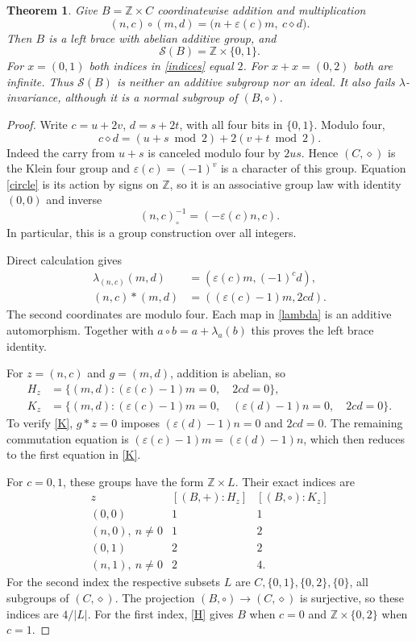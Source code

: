 \documentclass[11pt]{article}
\newtheorem{theorem}{Theorem}
\newcommand{\Z}{\mathbb Z}
\newcommand{\Sset}{\mathcal S}
\begin{document}
\begin{theorem}\label{main}
Give $B=\Z\times C$ coordinatewise addition and multiplication
\begin{equation}\label{circle}
 (n,c)\circ(m,d)=
 \bigl(n+\varepsilon(c)m,\ c\diamond d\bigr).
\end{equation}
Then $B$ is a left brace with abelian additive group, and
\[
 \Sset(B)=\Z\times\{0,1\}.
\]
For $x=(0,1)$ both indices in \eqref{indices} equal $2$.
For $x+x=(0,2)$ both are infinite.
Thus $\Sset(B)$ is neither an additive subgroup nor an ideal.
It also fails $\lambda$-invariance, although it is a normal subgroup of
$(B,\circ)$.
\end{theorem}

\begin{proof}
Write $c=u+2v$, $d=s+2t$, with all four bits in $\{0,1\}$.
Modulo four,
\[
 c\diamond d=(u+s\bmod2)+2(v+t\bmod2).
\]
Indeed the carry from $u+s$ is canceled modulo four by $2us$.
Hence $(C,\diamond)$ is the Klein four group and
$\varepsilon(c)=(-1)^v$ is a character of this group.
Equation \eqref{circle} is its action by signs on $\Z$, so it is an
associative group law with identity $(0,0)$ and inverse
\[
 (n,c)^{-1}_{\circ}=(-\varepsilon(c)n,c).
\]
In particular, this is a group construction over all integers.

Direct calculation gives
\begin{align}
 \lambda_{(n,c)}(m,d)&=(\varepsilon(c)m,(-1)^c d),\label{lambda}\\
 (n,c)*(m,d)&=((\varepsilon(c)-1)m,2cd).\label{star}
\end{align}
The second coordinates are modulo four.
Each map in \eqref{lambda} is an additive automorphism. Together
with $a\circ b=a+\lambda_a(b)$ this proves the left brace identity.

For $z=(n,c)$ and $g=(m,d)$, addition is abelian, so
\begin{align}
 H_z&=\{(m,d):(\varepsilon(c)-1)m=0,\quad 2cd=0\},\label{H}\\
 K_z&=\{(m,d):(\varepsilon(c)-1)m=0,\quad
             (\varepsilon(d)-1)n=0,\quad 2cd=0\}.\label{K}
\end{align}
To verify \eqref{K}, $g*z=0$ imposes
$(\varepsilon(d)-1)n=0$ and $2cd=0$.
The remaining commutation equation is
$(\varepsilon(c)-1)m=(\varepsilon(d)-1)n$,
which then reduces to the first equation in \eqref{K}.

For $c=0,1$, these groups have the form $\Z\times L$.
Their exact indices are
\[
\begin{array}{c|cc}
 z & [(B,+):H_z] & [(B,\circ):K_z]\\ \hline
 (0,0)&1&1\\
 (n,0),\ n\ne0&1&2\\
 (0,1)&2&2\\
 (n,1),\ n\ne0&2&4 .
\end{array}
\]
For the second index the respective subsets $L$ are
$C,\{0,1\},\{0,2\},\{0\}$, all subgroups of $(C,\diamond)$.
The projection $(B,\circ)\to(C,\diamond)$ is surjective, so these
indices are $4/|L|$.
For the first index, \eqref{H} gives $B$ when $c=0$ and
$\Z\times\{0,2\}$ when $c=1$.


\end{proof}
\end{document}
